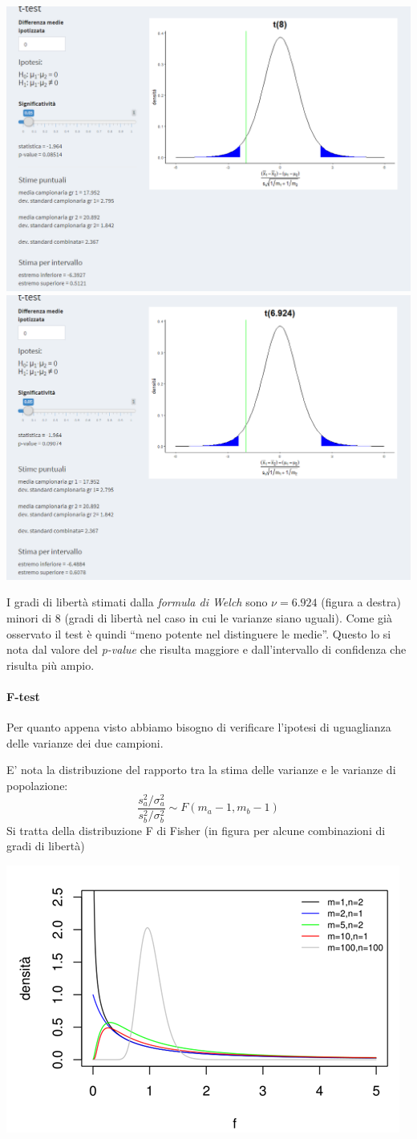 \documentclass[
  11pt,
]{book}
\begin{document}
\includegraphics[width=0.5\linewidth]{Immagini/Inferenziale/t_test_indip_1}
\includegraphics[width=0.5\linewidth]{Immagini/Inferenziale/t_test_indip_2}

I gradi di libertà stimati dalla \emph{formula di Welch} sono \(\nu = 6 . 924\) (figura a destra) minori di \(8\) (gradi di libertà
nel caso in cui le varianze siano uguali). Come già osservato il test è quindi ``meno potente nel distinguere le medie''.
Questo lo si nota dal valore del \emph{p-value} che risulta maggiore e dall'intervallo di confidenza che risulta più ampio.

\hypertarget{f-test}{%
\paragraph{F-test}\label{f-test}}

Per quanto appena visto abbiamo bisogno di verificare l'ipotesi di uguaglianza delle varianze dei due campioni.

E' nota la distribuzione del rapporto tra la stima delle varianze e le varianze di popolazione:
\[
\frac{s^2_a/\sigma^2_a}{s^2_b/\sigma^2_b} \sim F(m_a-1,m_b-1)
\]
Si tratta della distribuzione F di Fisher (in figura per alcune combinazioni di gradi di libertà)

\begin{center}\includegraphics[width=0.5\linewidth]{Immagini/Inferenziale/distr_f} \end{center}
\end{document}
